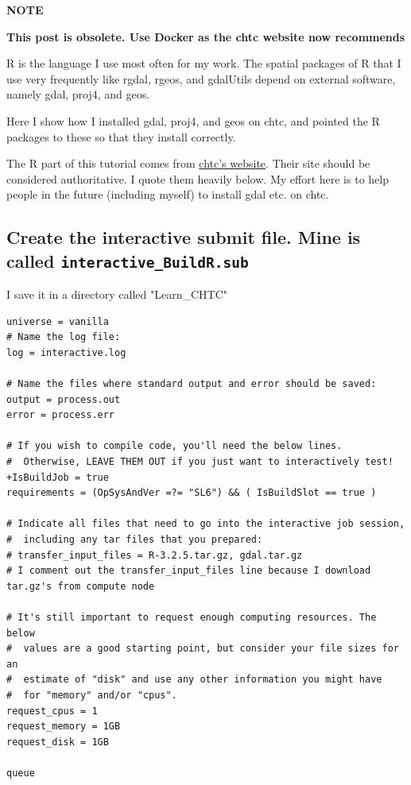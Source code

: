 \documentclass{article}
\begin{document}
\textbf{NOTE}

\textbf{This post is obsolete.  Use Docker as the chtc website now recommends}

R is the language I use most often for my work.  The spatial packages
of R that I use very frequently like rgdal, rgeos, and gdalUtils
depend on external software, namely gdal, proj4, and geos.

Here I show how I installed gdal, proj4, and geos on chtc, and pointed
the R packages to these so that they install correctly.

The R part of this tutorial comes from \href{http://chtc.cs.wisc.edu/r-jobs.shtml}{chtc's website}.  Their site
should be considered authoritative.  I quote them heavily below.  My
effort here is to help people in the future (including myself) to
install gdal etc. on chtc.



\subsection*{Create the interactive submit file.  Mine is called \texttt{interactive\_BuildR.sub}}
\label{sec:orga1a4291}

I save it in a directory called "Learn\_CHTC"

\begin{verbatim}
universe = vanilla
# Name the log file:
log = interactive.log

# Name the files where standard output and error should be saved:
output = process.out
error = process.err

# If you wish to compile code, you'll need the below lines.
#  Otherwise, LEAVE THEM OUT if you just want to interactively test!
+IsBuildJob = true
requirements = (OpSysAndVer =?= "SL6") && ( IsBuildSlot == true )

# Indicate all files that need to go into the interactive job session,
#  including any tar files that you prepared:
# transfer_input_files = R-3.2.5.tar.gz, gdal.tar.gz
# I comment out the transfer_input_files line because I download tar.gz's from compute node

# It's still important to request enough computing resources. The below
#  values are a good starting point, but consider your file sizes for an
#  estimate of "disk" and use any other information you might have
#  for "memory" and/or "cpus".
request_cpus = 1
request_memory = 1GB
request_disk = 1GB

queue

\end{verbatim}
\end{document}
